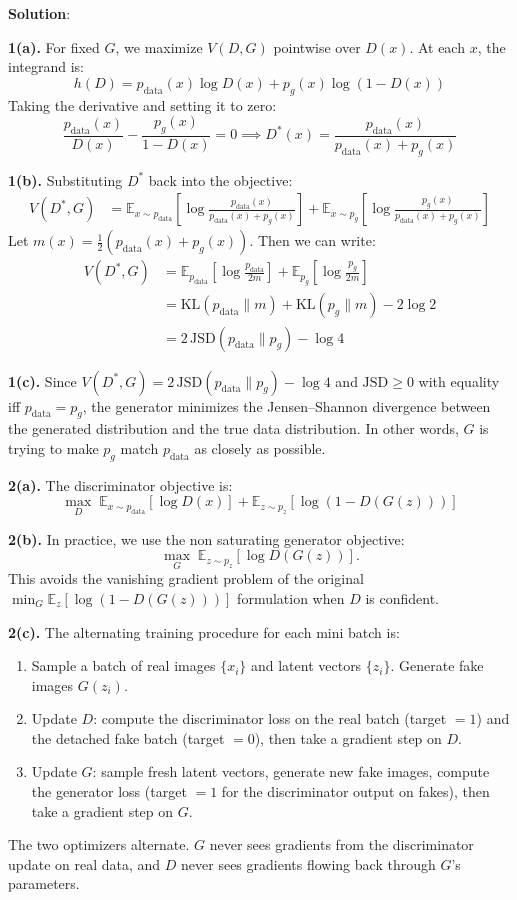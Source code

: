 \documentclass[submit]{../harvardml}
\newenvironment{solution}{%
    \vspace{2mm}\color{blue}\noindent\textbf{Solution}:\ }
{}
\begin{document}
\begin{solution}

\textbf{1(a).} For fixed $G$, we maximize $V(D,G)$ pointwise over $D(x)$. At each $x$, the integrand is:
\[
h(D) = p_{\mathrm{data}}(x)\log D(x) + p_g(x)\log(1 - D(x))
\]
Taking the derivative and setting it to zero:
\[
\frac{p_{\mathrm{data}}(x)}{D(x)} - \frac{p_g(x)}{1 - D(x)} = 0 \implies D^*(x) = \frac{p_{\mathrm{data}}(x)}{p_{\mathrm{data}}(x) + p_g(x)}
\]

\textbf{1(b).} Substituting $D^*$ back into the objective:
\begin{align*}
V(D^*, G) &= \mathbb{E}_{x \sim p_{\mathrm{data}}}\!\left[\log \frac{p_{\mathrm{data}}(x)}{p_{\mathrm{data}}(x) + p_g(x)}\right] + \mathbb{E}_{x \sim p_g}\!\left[\log \frac{p_g(x)}{p_{\mathrm{data}}(x) + p_g(x)}\right]
\end{align*}
Let $m(x) = \tfrac{1}{2}(p_{\mathrm{data}}(x) + p_g(x))$. Then we can write:
\begin{align*}
V(D^*, G) &= \mathbb{E}_{p_{\mathrm{data}}}\!\left[\log \frac{p_{\mathrm{data}}}{2m}\right] + \mathbb{E}_{p_g}\!\left[\log \frac{p_g}{2m}\right] \\
&= \mathrm{KL}(p_{\mathrm{data}} \| m) + \mathrm{KL}(p_g \| m) - 2\log 2 \\
&= 2\,\mathrm{JSD}(p_{\mathrm{data}} \| p_g) - \log 4
\end{align*}

\textbf{1(c).} Since $V(D^*,G) = 2\,\mathrm{JSD}(p_{\mathrm{data}} \| p_g) - \log 4$ and $\mathrm{JSD} \geq 0$ with equality iff $p_{\mathrm{data}} = p_g$, the generator minimizes the Jensen--Shannon divergence between the generated distribution and the true data distribution. In other words, $G$ is trying to make $p_g$ match $p_{\mathrm{data}}$ as closely as possible.

\textbf{2(a).} The discriminator objective is:
\[
\max_D \; \mathbb{E}_{x \sim p_{\mathrm{data}}}[\log D(x)] + \mathbb{E}_{z \sim p_z}[\log(1 - D(G(z)))]
\]

\textbf{2(b).} In practice, we use the non saturating generator objective:
\[
\max_G \; \mathbb{E}_{z \sim p_z}[\log D(G(z))].
\]
This avoids the vanishing gradient problem of the original $\min_G \mathbb{E}_{z}[\log(1 - D(G(z)))]$ formulation when $D$ is confident.

\textbf{2(c).} The alternating training procedure for each mini batch is:
\begin{enumerate}
\item Sample a batch of real images $\{x_i\}$ and latent vectors $\{z_i\}$. Generate fake images $G(z_i)$.
\item Update $D$: compute the discriminator loss on the real batch (target $= 1$) and the detached fake batch (target $= 0$), then take a gradient step on $D$.
\item Update $G$: sample fresh latent vectors, generate new fake images, compute the generator loss (target $= 1$ for the discriminator output on fakes), then take a gradient step on $G$.
\end{enumerate}
The two optimizers alternate. $G$ never sees gradients from the discriminator update on real data, and $D$ never sees gradients flowing back through $G$'s parameters.


\end{solution}
\end{document}
